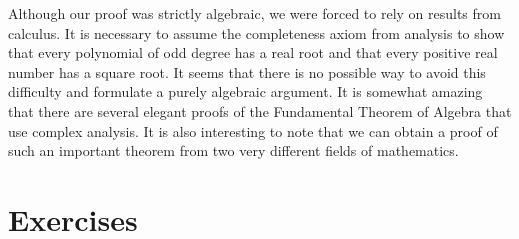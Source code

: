  
\medskip
 
 
Although our proof was strictly algebraic, we were forced to rely on
results from calculus.  It is necessary to assume the completeness
axiom from analysis to show that every polynomial of odd degree has a
real root and that every positive real number has a square root.  It
seems that there is no possible way to avoid this difficulty and
formulate a purely algebraic argument.  It is somewhat amazing that
there are several elegant proofs of the Fundamental Theorem of Algebra
that use complex analysis.  It is also interesting to note that we can
obtain a proof of such an important theorem from two very different
fields of mathematics. 
 
 
 
\section*{Exercises}
\exrule
 
